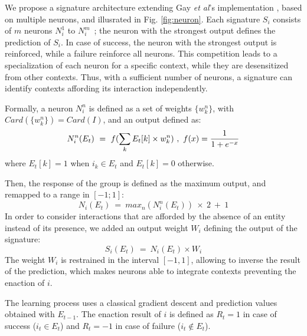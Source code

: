 \documentclass[conference]{IEEEtran}
\makeatletter
\let\cite\relax
\DeclareRobustCommand{\cite}{%
	\let\new@cite@pre\@gobble
	\@ifnextchar[\new@cite{\@citex[]}}
\def\new@cite[#1]{\@ifnextchar[{\new@citea{#1}}{\@citex[#1]}}
\def\new@citea#1{\def\new@cite@pre{#1}\@citex}
\makeatother
\begin{document}

We propose a signature architecture extending Gay \textit{et al}'s implementation \cite{gay:space}, based on multiple neurons, and illusrated in Fig. \ref{fig:neuron}. Each signature $S_i$ consists of $m$ neurons $N_i^1$ to $N_i^m$~; the neuron with the strongest output defines the prediction of $S_i$. In case of success, the neuron with the strongest output is reinforced, while a failure reinforce all neurons. This competition leads to a specialization of each neuron for a specific context, while they are desensitized from other contexts. Thus, with a sufficient number of neurons, a signature can identify contexts affording its interaction independently.

Formally, a neuron $N_i^n$ is defined as a set of weights $\{w_k^n\}$, with $Card(\{w_k^n\})=Card(I)$, and an output defined as:
\begin{equation}
N_i^n(E_t)~=~f(\sum_{k} E_t[k] \times w_k^n)~,~ f(x) = { {1}\over{1+e^{-x} }}
\end{equation}
where $E_t[k]=1$ when $i_k \in E_t$ and $E_t[k]=0$ otherwise.

Then, the response of the group is defined as the maximum output, and remapped to a range in $[-1;1]$:
\begin{equation}
N_i(E_t)~=~max_n (N_i^n(E_t) ) \: \times \: 2 ~+~ 1
\end{equation}
In order to consider interactions that are afforded by the absence of an entity instead of its presence, we added an output weight $W_i$ defining the output of the signature:
\begin{equation}
S_i(E_t)~=~N_i(E_t) \times W_i
\end{equation}
The weight $W_i$ is restrained in the interval $[-1,1]$, allowing to inverse the result of the prediction, which makes neurons able to integrate contexts preventing the enaction of $i$.

The learning process uses a classical gradient descent and prediction values obtained with $E_{t-1}$.
The enaction result of $i$ is defined as $R_t=1$ in case of success ($i_t \in E_t$) and $R_t=-1$ in case of failure ($i_t \not\in E_t$).
\end{document}
